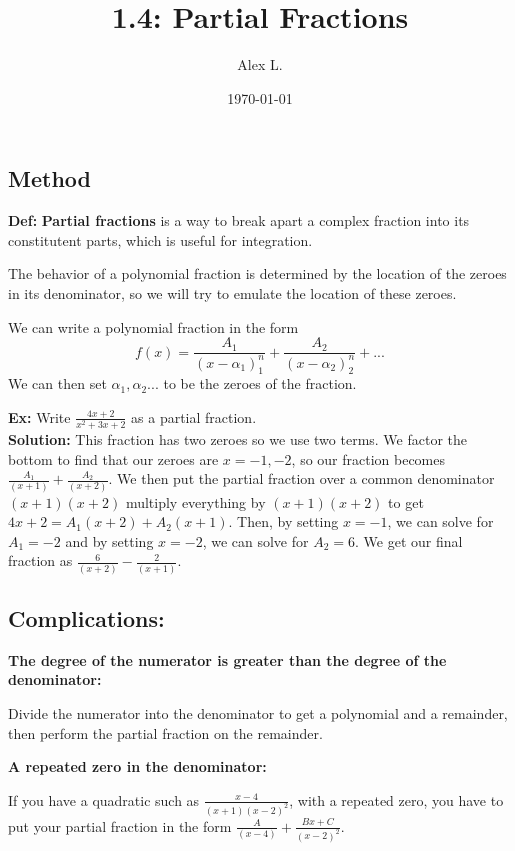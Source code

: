 \documentclass{article}
\title{1.4: Partial Fractions}
\author{Alex L.}
\date{\today}
\begin{document}
\maketitle

\subsection{Method}

\textbf{Def:} \textbf{Partial fractions} is a way to break apart a complex fraction into its constitutent parts, which is useful for integration. 

The behavior of a polynomial fraction is determined by the location of the zeroes in its denominator, so we will try to emulate the location of these zeroes. 

We can write a polynomial fraction in the form $$f(x) = \frac{A_1}{(x-\alpha_1)^n_1} + \frac{A_2}{(x-\alpha_2)^n_2} + ...$$ We can then set $\alpha_1, \alpha_2 ... $ to be the zeroes of the fraction.

\textbf{Ex:} Write $\frac{4x+2}{x^2 + 3x + 2}$ as a partial fraction. \\ \textbf{Solution:} This fraction has two zeroes so we use two terms. We factor the bottom to find that our zeroes are $x=-1,-2$, so our fraction becomes $\frac{A_1}{(x+1)} + \frac{A_2}{(x+2)}$. We then put the partial fraction over a common denominator $(x+1)(x+2)$ multiply everything by $(x+1)(x+2)$ to get $4x+2 = A_1(x+2) + A_2(x+1)$. Then, by setting $x=-1$, we can solve for $A_1 = -2$ and by setting $x=-2$, we can solve for $A_2 = 6$. We get our final fraction as $\frac{6}{(x+2)} - \frac{2}{(x+1)}$.

\subsection{Complications:}

\textbf{The degree of the numerator is greater than the degree of the denominator:}  

Divide the numerator into the denominator to get a polynomial and a remainder, then perform the partial fraction on the remainder. 

\textbf{A repeated zero in the denominator:} 

If you have a quadratic such as $\frac{x-4}{(x+1)(x-2)^2}$, with a repeated zero, you have to put your partial fraction in the form $\frac{A}{(x-4)} + \frac{Bx+C}{(x-2)^2}$.

    
\end{document}
